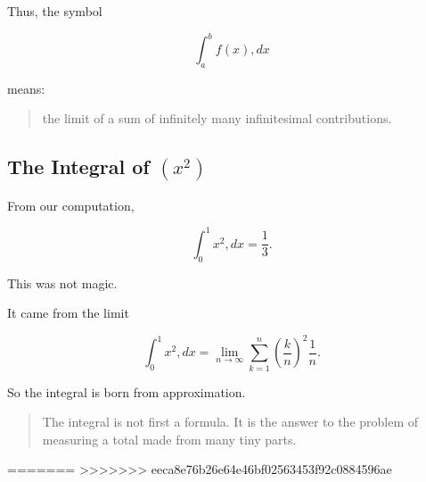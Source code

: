 Thus, the symbol

\[
\int_a^b f(x),dx
\]

means:

\begin{quote}
the limit of a sum of infinitely many infinitesimal contributions.
\end{quote}

\subsection{The Integral of $(x^2)$}

From our computation,

\[
\int_0^1 x^2,dx = \frac{1}{3}.
\]

This was not magic.

It came from the limit

\[
\int_0^1 x^2,dx = \lim_{n\to\infty}
\sum_{k=1}^{n}
\left(\frac{k}{n}\right)^2\frac{1}{n}.
\]

So the integral is born from approximation.

\begin{quote}
The integral is not first a formula. It is the answer to the problem of measuring a total made from many tiny parts.
\end{quote}

=======
>>>>>>> eeca8e76b26e64e46bf02563453f92c0884596ae
